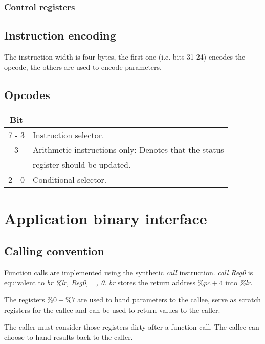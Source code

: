 \documentclass{article}
\begin{document}
\subsubsection{Control registers}

\subsection{Instruction encoding}

The instruction width is four bytes, the first one (i.e. bits 31-24)
encodes the opcode, the others are used to encode parameters.

\subsection{Opcodes}

\begin{center}
  \begin{tabular}{c|l}
    Bit & \\
    \hline
    7 - 3  & Instruction selector. \\
    3      & Arithmetic instructions only: Denotes that the status \\
           & register should be updated. \\
    2 - 0  & Conditional selector. \\
  \end{tabular}
\end{center}

\section{Application binary interface}

\subsection{Calling convention}

\newcommand{\I}[1]{\emph{#1}}

Function calls are implemented using the synthetic \I{call}
instruction. \I{call Reg0} is equivalent to \I{br \%lr, Reg0, \_,
  0}. \I{br} stores the return address \(\%pc + 4\) into \I{\%lr}.

The registers \(\%0 - \%7\) are used to hand parameters to the callee,
serve as scratch registers for the callee and can be used to return
values to the caller.

The caller must consider those registers dirty after a function call.
The callee can choose to hand results back to the caller.
\end{document}
